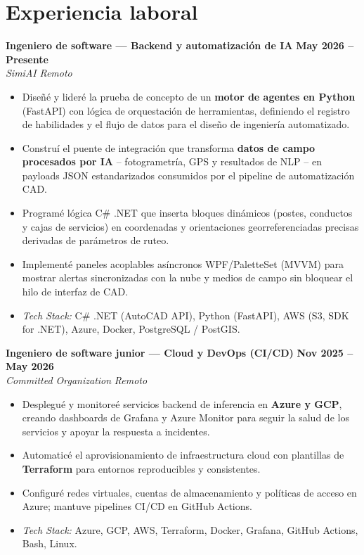 \documentclass[11pt,letterpaper]{article}
\newcommand{\cventry}[4]{%
  \textbf{#1} \hfill \textbf{#2}\\
  \textit{#3} \hfill \textit{#4}\par\nobreak\vspace{1pt}%
}
\begin{document}
\section{Experiencia laboral}

\cventry{Ingeniero de software --- Backend y automatización de IA}{May 2026 -- Presente}{SimiAI}{Remoto}
\begin{itemize}
  \item Diseñé y lideré la prueba de concepto de un \textbf{motor de agentes en Python} (FastAPI) con lógica de orquestación de herramientas, definiendo el registro de habilidades y el flujo de datos para el diseño de ingeniería automatizado.
  \item Construí el puente de integración que transforma \textbf{datos de campo procesados por IA} -- fotogrametría, GPS y resultados de NLP -- en payloads JSON estandarizados consumidos por el pipeline de automatización CAD.
  \item Programé lógica C\# .NET que inserta bloques dinámicos (postes, conductos y cajas de servicios) en coordenadas y orientaciones georreferenciadas precisas derivadas de parámetros de ruteo.
  \item Implementé paneles acoplables asíncronos WPF/PaletteSet (MVVM) para mostrar alertas sincronizadas con la nube y medios de campo sin bloquear el hilo de interfaz de CAD.
  \item \textit{Tech Stack:} C\# .NET (AutoCAD API), Python (FastAPI), AWS (S3, SDK for .NET), Azure, Docker, PostgreSQL / PostGIS.
\end{itemize}

\cventry{Ingeniero de software junior --- Cloud y DevOps (CI/CD)}{Nov 2025 -- May 2026}{Committed Organization}{Remoto}
\begin{itemize}
  \item Desplegué y monitoreé servicios backend de inferencia en \textbf{Azure y GCP}, creando dashboards de Grafana y Azure Monitor para seguir la salud de los servicios y apoyar la respuesta a incidentes.
  \item Automaticé el aprovisionamiento de infraestructura cloud con plantillas de \textbf{Terraform} para entornos reproducibles y consistentes.
  \item Configuré redes virtuales, cuentas de almacenamiento y políticas de acceso en Azure; mantuve pipelines CI/CD en GitHub Actions.
  \item \textit{Tech Stack:} Azure, GCP, AWS, Terraform, Docker, Grafana, GitHub Actions, Bash, Linux.
\end{itemize}
\end{document}
